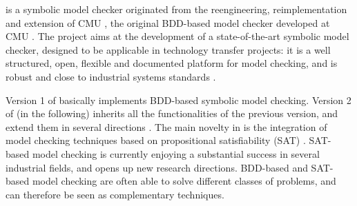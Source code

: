 \nusmv is a symbolic model checker originated from the
reengineering, reimplementation and extension of CMU \smv, the
original BDD-based model checker developed at CMU \cite{McMil93}.
The \nusmv project aims at the development of a state-of-the-art
symbolic model checker, designed to be applicable in technology
transfer projects: it is a well structured, open, flexible and
documented platform for model checking, and is robust and close to
industrial systems standards \cite{CCGR00}.

Version 1 of \nusmv basically implements BDD-based symbolic model checking.
Version 2 of \nusmv (\nusmvTwo in the following) 
inherits all the functionalities of the previous version, and extend them in
several directions \cite{CCG+02}.
The main novelty in \nusmvTwo is the integration of model checking
techniques based on propositional satisfiability (SAT) \cite{BCCZ99}.
SAT-based model checking is currently enjoying a substantial success
in several industrial fields, and opens up new research directions.
BDD-based and SAT-based model checking are often able to solve
different classes of problems, and can therefore be seen as
complementary techniques.

